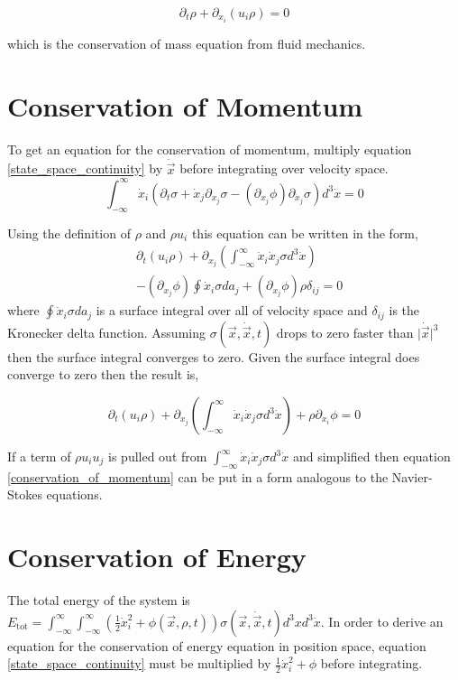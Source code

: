 \documentclass[%
 twocolumn,
 amsmath,amssymb,
 aps,
]{revtex4-1}
\newcommand{\dvec}[1]{\dot{\vec{#1}}}
\newcommand{\intVdot}[1]{\int_{-\infty}^{\infty} #1 d^3\dot{x}}
\newcommand{\intVVdot}[1]{\int_{-\infty}^{\infty}\int_{-\infty}^{\infty} #1 d^3xd^3\dot{x}}
\begin{document}
\begin{equation}
\partial_t\rho + \partial_{x_i}\left(u_i\rho\right)=0
\label{conservation_of_mass}
\end{equation}

which is the conservation of mass equation from fluid mechanics.

\section{Conservation of Momentum}
To get an equation for the conservation of momentum, multiply equation \eqref{state_space_continuity} by $\dvec{x}$ before integrating over velocity space.
\[
\intVdot{\dot{x}_i\left(\partial_t \sigma + \dot{x}_j\partial_{x_j}\sigma-\left(\partial_{x_j}\phi\right)\partial_{\dot{x}_j}\sigma\right)}=0
\]

Using the definition of $\rho$ and $\rho u_i$ this equation can be written in the form,
\[
\begin{split}
& \partial_t\left(u_i\rho\right) + \partial_{x_j}\left(\intVdot{\dot{x}_i\dot{x}_j\sigma}\right) \\ & - \left(\partial_{x_j}\phi\right)\oint\dot{x}_i\sigma da_j + \left(\partial_{x_j}\phi\right)\rho\delta_{i j}=0
\end{split}
\]
where $\oint\dot{x}_i\sigma da_j$ is a surface integral over all of velocity space and $\delta_{ij}$ is the Kronecker delta function. Assuming $\sigma(\vec{x}, \dvec{x}, t)$ drops to zero faster than $\lvert\dvec{x}\rvert^3$ then the surface integral converges to zero. Given the surface integral does converge to zero then the result is,

\begin{equation}
\partial_t\left(u_i\rho\right) + \partial_{x_j}\left(\intVdot{\dot{x}_i\dot{x}_j\sigma}\right) + \rho\partial_{x_i}\phi=0
\label{conservation_of_momentum}
\end{equation}

If a term of $\rho u_i u_j$ is pulled out from $\intVdot{\dot{x}_i\dot{x}_j\sigma}$ and simplified then equation \eqref{conservation_of_momentum} can be put in a form analogous to the Navier-Stokes equations.

\section{Conservation of Energy}
The total energy of the system is $E_{\text{tot}}=\intVVdot{\left(\frac{1}{2}\dot{x}_i^2 + \phi(\vec{x}, \rho, t)\right)\sigma(\vec{x}, \dvec{x}, t)}$. In order to derive an equation for the conservation of energy equation in position space, equation \eqref{state_space_continuity} must be multiplied by $\frac{1}{2}\dot{x}_i^2 + \phi$ before integrating. 
\end{document}
